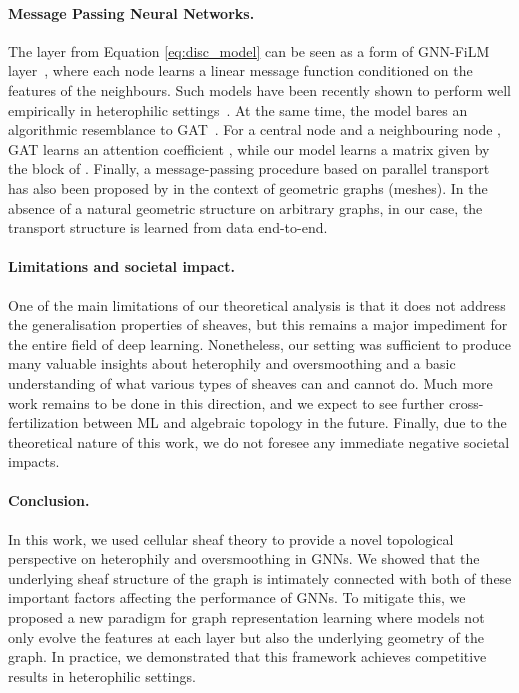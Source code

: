 \documentclass{article}
\begin{document}
\paragraph{Message Passing Neural Networks.} The layer from Equation \ref{eq:disc_model} can be seen as a form of GNN-FiLM layer~\citep{brockschmidt2020gnn, perez2018film}, where each node learns a linear message function conditioned on the features of the neighbours. Such models have been recently shown to perform well empirically in heterophilic settings~\citep{palowitch2022graphworld}. At the same time, the model bares an algorithmic resemblance to GAT~\citep{velivckovic2017graph}. For a central node  and a neighbouring node , GAT learns an attention coefficient , while our model learns a matrix given by the block  of . Finally, a message-passing procedure based on parallel transport has also been proposed by \citet{haan2021gauge} in the context of geometric graphs (meshes). In the absence of a natural geometric structure on arbitrary graphs, in our case, the transport structure is learned from data end-to-end.    

\paragraph{Limitations and societal impact.} One of the main limitations of our theoretical analysis is that it does not address the generalisation properties of sheaves, but this remains a major impediment for the entire field of deep learning. Nonetheless, our setting was sufficient to produce many valuable insights about heterophily and oversmoothing and a basic understanding of what various types of sheaves can and cannot do. Much more work remains to be done in this direction, and we expect to see further cross-fertilization between ML and algebraic topology in the future. Finally, due to the theoretical nature of this work, we do not foresee any immediate negative societal impacts.  


\paragraph{Conclusion.} In this work, we used cellular sheaf theory to provide a novel topological perspective on heterophily and oversmoothing in GNNs. We showed that the underlying sheaf structure of the graph is intimately connected with both of these important factors affecting the performance of GNNs. To mitigate this, we proposed a new paradigm for graph representation learning where models not only evolve the features at each layer but also the underlying geometry of the graph. In practice, we demonstrated that this framework achieves competitive results in heterophilic settings.  
\vspace{-7pt}
\end{document}
